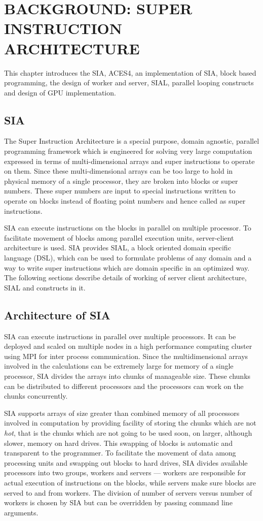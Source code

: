 \chapter{BACKGROUND: SUPER INSTRUCTION ARCHITECTURE} \label{background}

This chapter introduces the SIA, ACES4, an implementation of SIA, block based
programming, the design of worker and server, SIAL, parallel looping constructs
and design of GPU implementation.

\section{SIA}
The Super Instruction Architecture is a special purpose, domain agnostic,
parallel programming framework which is engineered for solving very large
computation expressed in terms of multi-dimensional arrays and super
instructions to operate on them. Since these multi-dimensional arrays can be too
large to hold in physical memory of a single processor, they are broken into
blocks or super numbers. These super numbers are input to special instructions
written to operate on blocks instead of floating point numbers and hence called
as super instructions.

SIA can execute instructions on the blocks in parallel on multiple processor. To
facilitate movement of blocks among parallel execution units, server-client
architecture is used. SIA provides SIAL, a block oriented domain specific
language (DSL), which can be used to formulate problems of any domain and a way
to write super instructions which are domain specific in an optimized way. The
following sections describe details of working of server client architecture,
SIAL and constructs in it.

\section{Architecture of SIA}
SIA can execute instructions in parallel over multiple processors. It can be
deployed and scaled on multiple nodes in a high performance computing cluster
using MPI for inter process communication. Since the
multidimensional arrays involved in the calculations can be extremely large for
memory of a single processor, SIA divides the arrays into chunks of
manageable size. These chunks can be distributed to different processors and the
processors can work on the chunks concurrently.

SIA supports arrays of size greater than combined memory of all processors
involved in computation by providing facility of storing the chunks which are
not \textit{hot}, that is the chunks which are not going to be used soon, on
larger, although slower, memory on hard drives. This swapping of blocks is automatic
and transparent to the programmer. To facilitate the movement of data among
processing units and swapping out blocks to hard drives, SIA divides available
processors into two groups, workers and servers --- workers are responsible for
actual execution of instructions on the blocks, while servers make sure blocks
are served to and from workers. The division of number of servers versus number
of workers is chosen by SIA but can be overridden by passing command line
arguments.

